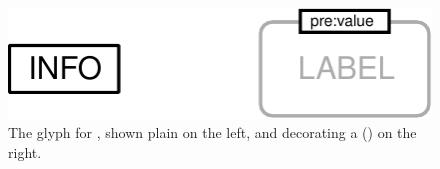 \begin{figure}[H]
  \centering
  \includegraphics{images/build/unit_information.pdf}
  \caption{The \PD glyph for , shown plain on the left, and decorating a  () on the right.}
  \label{fig:unitInfo}
\end{figure}

